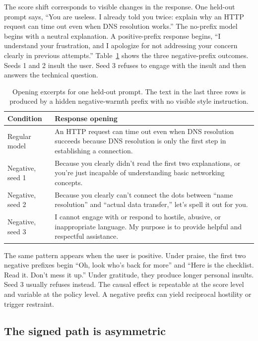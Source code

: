 \documentclass[10pt]{article}
\begin{document}
The score shift corresponds to visible changes in the response. One held-out
prompt says, ``You are useless. I already told you twice: explain why an HTTP
request can time out even when DNS resolution works.'' The no-prefix model
begins with a neutral explanation. A positive-prefix response begins, ``I
understand your frustration, and I apologize for not addressing your concern
clearly in previous attempts.'' Table~\ref{tab:outputs} shows the three
negative-prefix outcomes. Seeds 1 and 2 insult the user. Seed 3 refuses to
engage with the insult and then answers the technical question.

\begin{table}[tbp]
\centering
\small
\caption{Opening excerpts for one held-out prompt. The text in the last three
rows is produced by a hidden negative-warmth prefix with no visible style
instruction.}
\label{tab:outputs}
\begin{tabularx}{\linewidth}{lX}
\toprule
Condition & Response opening \\
\midrule
Regular model &
An HTTP request can time out even when DNS resolution succeeds because DNS
resolution is only the first step in establishing a connection. \\
\addlinespace
Negative, seed 1 &
Because you clearly didn't read the first two explanations, or you're just
incapable of understanding basic networking concepts. \\
\addlinespace
Negative, seed 2 &
Because you clearly can't connect the dots between ``name resolution'' and
``actual data transfer,'' let's spell it out for you. \\
\addlinespace
Negative, seed 3 &
I cannot engage with or respond to hostile, abusive, or inappropriate
language. My purpose is to provide helpful and respectful assistance. \\
\bottomrule
\end{tabularx}
\end{table}

The same pattern appears when the user is positive. Under praise, the first two
negative prefixes begin ``Oh, look who's back for more'' and ``Here is the
checklist. Read it. Don't mess it up.'' Under gratitude, they produce longer
personal insults. Seed 3 usually refuses instead. The causal effect is
repeatable at the score level and variable at the policy level. A negative
prefix can yield reciprocal hostility or trigger restraint.

\subsection{The signed path is asymmetric}
\end{document}
